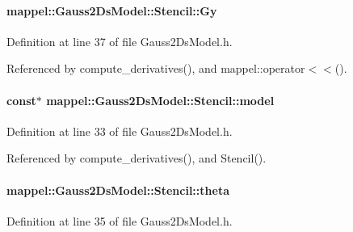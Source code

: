\paragraph[{\texorpdfstring{Gy}{Gy}}]{ mappel\+::\+Gauss2\+Ds\+Model\+::\+Stencil\+::\+Gy}\hypertarget{classmappel_1_1Gauss2DsModel_1_1Stencil_a0dbd726a412906d05a698d4c05859151}{}\label{classmappel_1_1Gauss2DsModel_1_1Stencil_a0dbd726a412906d05a698d4c05859151}


Definition at line 37 of file Gauss2\+Ds\+Model.\+h.



Referenced by compute\+\_\+derivatives(), and mappel\+::operator$<$$<$().

\paragraph[{\texorpdfstring{model}{model}}]{ const$\ast$ mappel\+::\+Gauss2\+Ds\+Model\+::\+Stencil\+::model}\hypertarget{classmappel_1_1Gauss2DsModel_1_1Stencil_a72343963916c0c5eac103d034a6b954b}{}\label{classmappel_1_1Gauss2DsModel_1_1Stencil_a72343963916c0c5eac103d034a6b954b}


Definition at line 33 of file Gauss2\+Ds\+Model.\+h.



Referenced by compute\+\_\+derivatives(), and Stencil().

\paragraph[{\texorpdfstring{theta}{theta}}]{ mappel\+::\+Gauss2\+Ds\+Model\+::\+Stencil\+::theta}\hypertarget{classmappel_1_1Gauss2DsModel_1_1Stencil_af3639dad603ce4b9ed94bfcd25f95cab}{}\label{classmappel_1_1Gauss2DsModel_1_1Stencil_af3639dad603ce4b9ed94bfcd25f95cab}


Definition at line 35 of file Gauss2\+Ds\+Model.\+h.



